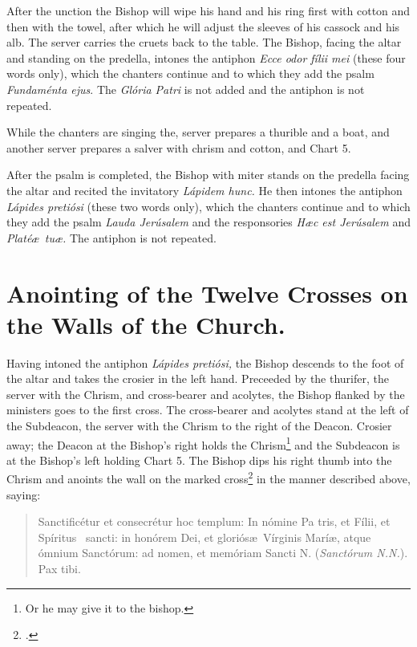\documentclass[letterpaper]{report}
\begin{document}
{    \rubric After the unction the Bishop will wipe his hand and his ring first
    with cotton and then with the towel, after which he will adjust the sleeves
    of his cassock and his alb. The server carries the cruets back to the
    table. The Bishop, facing the altar and standing on the predella, intones
    the antiphon \textit{Ecce odor f\'ilii mei} (these four words only), which
    the chanters continue and to which they add the psalm \textit{Fundam\'enta
    ejus}. The \textit{Glória Patri} is not added and the antiphon is not
    repeated.

    While the chanters are singing the, server prepares a thurible and a boat,
    and another server prepares a salver with chrism and cotton, and Chart 5.

    \rubric After the psalm is completed, the Bishop with miter stands on the
    predella facing the altar and recited the invitatory \textit{Lápidem hunc.}
    He then intones the antiphon \textit{Lápides pretiósi} (these two words
    only), which the chanters continue and to which they add the psalm
    \textit{Lauda Jerúsalem} and the responsories \textit{H\ae c est Jerúsalem}
    and \textit{Platé\ae\ tu\ae.} The antiphon is not repeated.

    \section{Anointing of the Twelve Crosses on the Walls of the Church.}

    \rubric Having intoned the antiphon \textit{Lápides pretiósi,} the Bishop
    descends to the foot of the altar and takes the crosier in the left hand.
    Preceeded by the thurifer, the server with the Chrism, and cross-bearer and
    acolytes, the Bishop flanked by the ministers goes to the first cross. The
    cross-bearer and acolytes stand at the left of the Subdeacon, the server
    with the Chrism to the right of the Deacon. Crosier away; the Deacon at the
    Bishop's right holds the Chrism\footnote{Or he may give it to the bishop.}
    and the Subdeacon is at the Bishop's left holding Chart 5. The Bishop dips
    his right thumb into the Chrism and anoints the wall on the marked
    cross\footcite[\textit{Above} or \textit{below} the cross, if it be of
    marble or metal. See][note 2, p. 112.]{stehle} in the manner described
    above, saying:

    \begin{quote}
        Sancti\cross ficétur et conse\cross crétur hoc templum: In nómine Pa\cross
        tris, et Fí\cross lii, et Spíritus \cross\ sancti: in honórem Dei, et
        gloriós\ae\ Vírginis Marí\ae, atque ómnium Sanctórum: ad nomen, et memóriam
        Sancti N. (\textit{Sanctórum N.N.}). Pax tibi.
    \end{quote}

}
\end{document}
